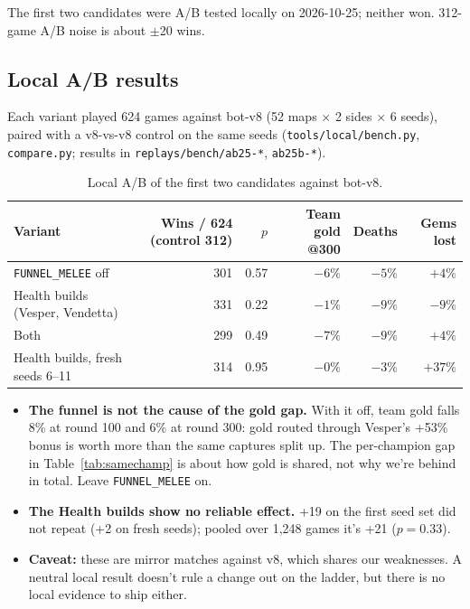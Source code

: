 \documentclass[11pt,a4paper]{article}
\begin{document}
The first two candidates were A/B tested locally on 2026-10-25; neither won. 312-game A/B noise is about $\pm$20 wins.

\subsection*{Local A/B results}

Each variant played 624 games against bot-v8 (52 maps $\times$ 2 sides $\times$ 6 seeds), paired with a v8-vs-v8 control on the same seeds (\texttt{tools/local/bench.py}, \texttt{compare.py}; results in \texttt{replays/bench/ab25-*}, \texttt{ab25b-*}).

\begin{table}[H]
\centering\footnotesize\setlength{\tabcolsep}{5pt}
\begin{tabular}{lrrrrr}
\toprule
Variant & Wins / 624 (control 312) & $p$ & Team gold @300 & Deaths & Gems lost \\
\midrule
\texttt{FUNNEL\_MELEE} off & 301 & 0.57 & \textcolor{cBad}{$-6\%$} & $-5\%$ & $+4\%$ \\
Health builds (Vesper, Vendetta) & 331 & 0.22 & $-1\%$ & $-9\%$ & $-9\%$ \\
Both & 299 & 0.49 & \textcolor{cBad}{$-7\%$} & $-9\%$ & $+4\%$ \\
Health builds, fresh seeds 6--11 & 314 & 0.95 & $-0\%$ & $-3\%$ & $+37\%$ \\
\bottomrule
\end{tabular}
\caption{Local A/B of the first two candidates against bot-v8.}
\end{table}

\begin{itemize}
  \item \textbf{The funnel is not the cause of the gold gap.} With it off, team gold falls 8\% at round 100 and 6\% at round 300: gold routed through Vesper's +53\% bonus is worth more than the same captures split up. The per-champion gap in Table~\ref{tab:samechamp} is about how gold is shared, not why we're behind in total. Leave \texttt{FUNNEL\_MELEE} on.
  \item \textbf{The Health builds show no reliable effect.} +19 on the first seed set did not repeat (+2 on fresh seeds); pooled over 1,248 games it's +21 ($p = 0.33$).
  \item \textbf{Caveat:} these are mirror matches against v8, which shares our weaknesses. A neutral local result doesn't rule a change out on the ladder, but there is no local evidence to ship either.
\end{itemize}
\end{document}
